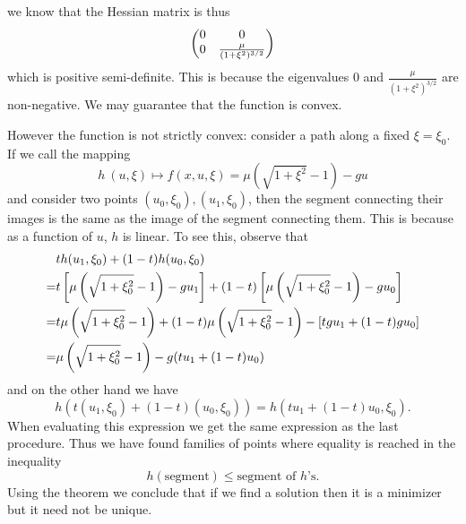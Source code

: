 \documentclass[12pt]{memoir}
\begin{document}
\begin{ptcbr}
\begin{enumerate}[i)]
    we know that the Hessian matrix is thus 
    $$\begin{pmatrix} 0 & 0 \\ 0 & \frac{\mu}{(1+\xi^2)^{3/2}} \end{pmatrix}$$
    which is positive semi-definite. This is because the eigenvalues $0$ and $\frac{\mu}{(1+\xi^2)^{3/2}}$ are non-negative. We may guarantee that the function is convex.\par
    However the function is not strictly convex: consider a path along a fixed $\xi=\xi_0$. If we call the mapping 
    $$h\: (u,\xi)\mapsto f(x,u,\xi)=\mu\left(\sqrt{1+\xi^2}-1\right)-gu$$
    and consider two points $(u_0,\xi_0), (u_1,\xi_0)$, then the segment connecting their images is the same as the image of the segment connecting them. This is because as a function of $u$, $h$ is linear. To see this, observe that 
    \begin{align*}
        &th(u_1,\xi_0)+(1-t)h(u_0,\xi_0)\\
        =&t\left\lbrack\mu\left(\sqrt{1+\xi_0^2}-1\right)-gu_1\right\rbrack+(1-t)\left\lbrack\mu\left(\sqrt{1+\xi_0^2}-1\right)-gu_0\right\rbrack\\
        =&t\mu\left(\sqrt{1+\xi_0^2}-1\right)+(1-t)\mu\left(\sqrt{1+\xi_0^2}-1\right)-\left\lbrack tgu_1+(1-t)gu_0\right\rbrack\\
        =&\mu\left(\sqrt{1+\xi_0^2}-1\right)-g(tu_1+(1-t)u_0)
    \end{align*} 
    and on the other hand we have 
    $$h(t(u_1,\xi_0)+(1-t)(u_0,\xi_0))=h(tu_1+(1-t)u_0,\xi_0).$$
    When evaluating this expression we get the same expression as the last procedure. Thus we have found families of points where equality is reached in the inequality 
    $$h(\text{segment})\leq\text{segment of }h\text{'s}.$$
    Using the theorem we conclude that if we find a solution then it is a minimizer but it need not be unique.
    \end{enumerate}
\end{ptcbr}
\end{document}
